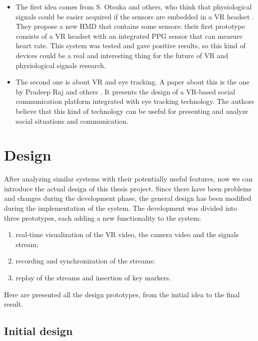 \documentclass[binding=0.6cm,LaM]{sapthesis}
\begin{document}
\begin{itemize}

\item The first idea comes from S. Otsuka and others, who think that physiological signals could be easier acquired if the sensors are embedded in a VR headset \cite{otsuka2017physiological}. They propose a new HMD that contains some sensors: their first prototype consists of a VR headset with an integrated PPG sensor that can measure heart rate. This system was tested and gave positive results, so this kind of devices could be a real and interesting thing for the future of VR and physiological signals research.

\item The second one is about VR and eye tracking. A paper about this is the one by Pradeep Raj and others \cite{kb2017gaze}. It presents the design of a VR-based social communication platform integrated with eye tracking technology. The authors believe that this kind of technology can be useful for presenting and analyze social situations and communication.

\end{itemize}

\section{Design}
After analyzing similar systems with their potentially useful features, now we can introduce the actual design of this thesis project. 
Since there have been problems and changes during the development phase, the general design has been modified during the implementation of the system. 
The development was divided into three prototypes, each adding a new functionality to the system:

\begin{enumerate}
\item real-time visualization of the VR video, the camera video and the signals stream;
\item recording and synchronization of the streams;
\item replay of the streams and insertion of key markers.
\end{enumerate} 

Here are presented all the design prototypes, from the initial idea to the final result.

\subsection{Initial design}
\end{document}
